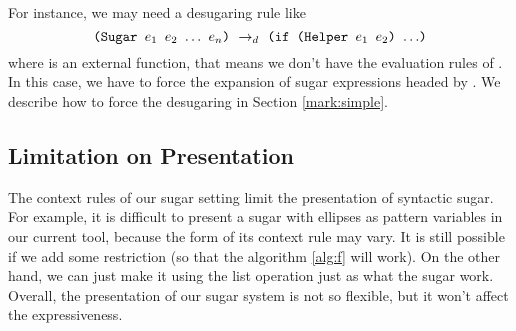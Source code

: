 For instance, we may need a desugaring rule like
\[
\texttt{(Sugar $e_1$ $e_2$ $\ldots$ $e_n$)} ~\rightarrow_d~ \texttt{(if (Helper $e_1$ $e_2$) $\ldots$)}
\]
where  is an external function, that means we don't have the evaluation rules of . In this case, we have to force the expansion of sugar expressions headed by . We describe how to force the desugaring in Section \ref{mark:simple}.

\subsection{Limitation on Presentation}
\todo{}
The context rules of our sugar setting limit the presentation of syntactic sugar. For example, it is difficult to present a sugar with ellipses as pattern variables in our current tool, because the form of its context rule may vary. It is still possible if we add some
restriction (so that the algorithm \ref{alg:f} will work). On the other hand, we can just make it using the list operation just as what the sugar  work. Overall, the presentation of our sugar system is not so flexible, but it won't affect the expressiveness.



